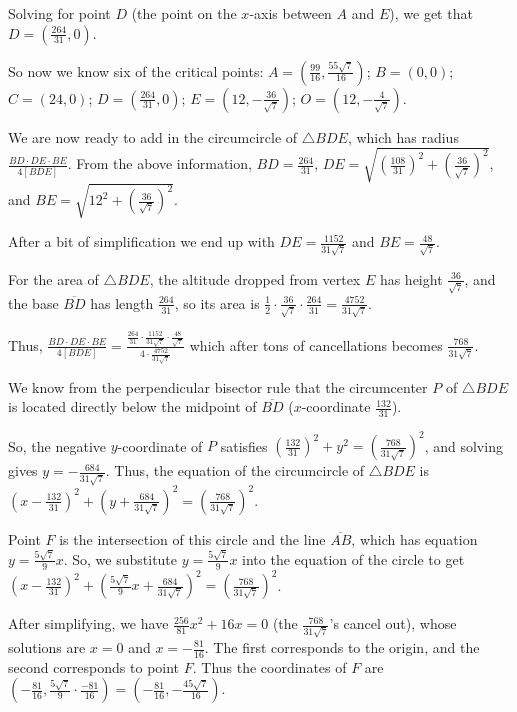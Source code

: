 \begin{enumerate}
 Solving for point $D$ (the point on the $x$-axis between $A$ and $E$), we get that $D=(\frac{264}{31}, 0)$.

 So now we know six of the critical points: $A=(\frac{99}{16}, \frac{55\sqrt7}{16})$; $B=(0, 0)$; $C=(24, 0)$; $D=(\frac{264}{31}, 0)$; $E=(12, -\frac{36}{\sqrt7})$; $O=(12, -\frac{4}{\sqrt7})$.

 We are now ready to add in the circumcircle of $\triangle BDE$, which has radius $\frac{BD\cdot DE\cdot BE}{4[BDE]}$. From the above information, $BD=\frac{264}{31}$, $DE=\sqrt{(\frac{108}{31})^2+(\frac{36}{\sqrt7})^2}$, and $BE=\sqrt{12^2+(\frac{36}{\sqrt7})^2}$.

 After a bit of simplification we end up with $DE=\frac{1152}{31\sqrt7}$ and $BE=\frac{48}{\sqrt7}$.

 For the area of $\triangle BDE$, the altitude dropped from vertex $E$ has height $\frac{36}{\sqrt7}$, and the base $\overline{BD}$ has length $\frac{264}{31}$, so its area is $\frac12\cdot\frac{36}{\sqrt7}\cdot\frac{264}{31}=\frac{4752}{31\sqrt7}$.

 Thus, $\frac{BD\cdot DE\cdot BE}{4[BDE]}=\frac{\frac{264}{31}\cdot\frac{1152}{31\sqrt7}\cdot\frac{48}{\sqrt{7}}}{4\cdot\frac{4752}{31\sqrt7}}$ which after tons of cancellations becomes $\frac{768}{31\sqrt7}$.

 We know from the perpendicular bisector rule that the circumcenter $P$ of $\triangle BDE$ is located directly below the midpoint of $\overline{BD}$ ($x$-coordinate $\frac{132}{31}$).

 So, the negative $y$-coordinate of $P$ satisfies $(\frac{132}{31})^2+y^2=(\frac{768}{31\sqrt7})^2$, and solving gives $y=-\frac{684}{31\sqrt7}$. Thus, the equation of the circumcircle of $\triangle BDE$ is $(x-\frac{132}{31})^2+(y+\frac{684}{31\sqrt7})^2=(\frac{768}{31\sqrt7})^2$.

 Point $F$ is the intersection of this circle and the line $\overline{AB}$, which has equation $y=\frac{5\sqrt7}{9}x$. So, we substitute $y=\frac{5\sqrt7}{9}x$ into the equation of the circle to get $(x-\frac{132}{31})^2+(\frac{5\sqrt7}{9}x+\frac{684}{31\sqrt7})^2=(\frac{768}{31\sqrt7})^2$.

 After simplifying, we have $\frac{256}{81}x^2+16x=0$ (the $\frac{768}{31\sqrt7}$'s cancel out), whose solutions are $x=0$ and $x=-\frac{81}{16}$. The first corresponds to the origin, and the second corresponds to point $F$. Thus the coordinates of $F$ are $(-\frac{81}{16}, \frac{5\sqrt7}{9}\cdot\frac{-81}{16})=(-\frac{81}{16}, -\frac{45\sqrt7}{16})$.


\end{enumerate}
